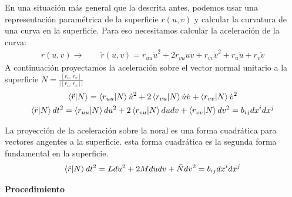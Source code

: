 \documentclass{article}
\newcommand{\caja}[3]{%
  \begin{tcolorbox}[colback=#1!5!white,colframe=#1!25!black,title=#2]
    #3
  \end{tcolorbox}%
}
\begin{document}
En una situación más general que la descrita antes, podemos usar una representación paramétrica de la superficie $ r\left(u,v\right)  $ y calcular la curvatura de una curva en la superficie. Para eso necesitamos calcular la aceleración de la curva: 
\begin{gather}
  r\left(u,v\right) \rightarrow \qquad \ddot r\left(u,v\right)=r _{uu } \dot u ^ {2 } + 2 r _{vu } \dot u \dot v + r _{vv } \dot v ^ {2 } + r _{u } \ddot u + r _{v } \ddot v 
\end{gather}
A continuación proyectamos la aceleración sobre el vector normal unitario a la superficie $ N = \frac{[r _{u } , r _{v } ]}{|[r _{u } , r _{v } ]|} $   
\begin{gather}
  \bra{\ddot r }\ket{N } = \bra{r _{uu }}\ket{N }\dot u ^ {2 } + 2 \bra{r _{vu } }\ket{N }\dot u \dot v + \bra{r _{vv } }\ket{N }\dot v ^ {2 }\\
  \bra{\ddot r }\ket{N }dt ^2 = \bra{r _{uu } }\ket{N }du ^2 + 2 \bra{r _{vu } }\ket{N }du dv + \bra{r _{vv } }\ket{N }dv ^2 = b _{ij } dx ^ {i }dx ^ {j }    
\end{gather}
\caja{green}{Segunda forma fundamental en la superficie }{
  La proyección de la aceleración sobre la noral es una forma cuadrática para vectores angentes a la superficie. esta forma cuadrática es la segunda forma fundamental en la superficie. 
  \begin{gather}
    \bra{\ddot r }\ket{N }dt ^ {2 } = L du ^ {2 } + 2M du dv + \bar N dv ^ {2 } = b _{ij } dx ^ {i }dx ^ {j }  
  \end{gather}
}

\textbf{Procedimiento }
\end{document}

